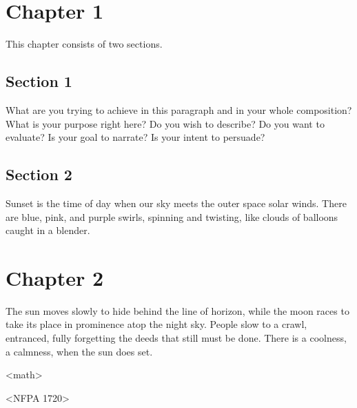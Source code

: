 \chapter{Chapter 1}
\label{chapter:1}
This chapter consists of two sections.

\section{Section 1}
\label{section:1}

What are you trying to achieve in this paragraph and in your whole composition? What is your purpose right here? Do you wish to describe? Do you want to evaluate? Is your goal to narrate? Is your intent to persuade?

\section{Section 2}
\label{section:2}

Sunset is the time of day when our sky meets the outer space solar winds. There are blue, pink, and purple swirls, spinning and twisting, like clouds of balloons caught in a blender.


\chapter{Chapter 2}

The sun moves slowly to hide behind the line of horizon, while the moon races to take its place in prominence atop the night sky. People slow to a crawl, entranced, fully forgetting the deeds that still must be done. There is a coolness, a calmness, when the sun does set.

\begin{concepthierarchy}
    \begin{concept}<math>
    \end{concept}
    \begin{concept}<NFPA 1720>
    \end{concept}
\end{concepthierarchy}
